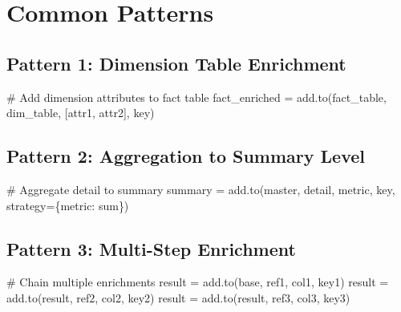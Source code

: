 \documentclass[
  letterpaper,
]{scrbook}
\newenvironment{Shaded}{\begin{snugshade}}{\end{snugshade}}
\newcommand{\CommentTok}[1]{\textcolor[rgb]{0.37,0.37,0.37}{#1}}
\newcommand{\NormalTok}[1]{\textcolor[rgb]{0.00,0.23,0.31}{#1}}
\newcommand{\OperatorTok}[1]{\textcolor[rgb]{0.37,0.37,0.37}{#1}}
\newcommand{\StringTok}[1]{\textcolor[rgb]{0.13,0.47,0.30}{#1}}
\begin{document}
\section{Common Patterns}\label{common-patterns}

\subsection{Pattern 1: Dimension Table
Enrichment}\label{pattern-1-dimension-table-enrichment}

\begin{Shaded}
\begin{Highlighting}[]
\CommentTok{\# Add dimension attributes to fact table}
\NormalTok{fact\_enriched }\OperatorTok{=}\NormalTok{ add.to(fact\_table, dim\_table, [}\StringTok{\textquotesingle{}attr1\textquotesingle{}}\NormalTok{, }\StringTok{\textquotesingle{}attr2\textquotesingle{}}\NormalTok{], }\StringTok{\textquotesingle{}key\textquotesingle{}}\NormalTok{)}
\end{Highlighting}
\end{Shaded}

\subsection{Pattern 2: Aggregation to Summary
Level}\label{pattern-2-aggregation-to-summary-level}

\begin{Shaded}
\begin{Highlighting}[]
\CommentTok{\# Aggregate detail to summary}
\NormalTok{summary }\OperatorTok{=}\NormalTok{ add.to(master, detail, }\StringTok{\textquotesingle{}metric\textquotesingle{}}\NormalTok{, }\StringTok{\textquotesingle{}key\textquotesingle{}}\NormalTok{, strategy}\OperatorTok{=}\NormalTok{\{}\StringTok{\textquotesingle{}metric\textquotesingle{}}\NormalTok{: }\StringTok{\textquotesingle{}sum\textquotesingle{}}\NormalTok{\})}
\end{Highlighting}
\end{Shaded}

\subsection{Pattern 3: Multi-Step
Enrichment}\label{pattern-3-multi-step-enrichment}

\begin{Shaded}
\begin{Highlighting}[]
\CommentTok{\# Chain multiple enrichments}
\NormalTok{result }\OperatorTok{=}\NormalTok{ add.to(base, ref1, }\StringTok{\textquotesingle{}col1\textquotesingle{}}\NormalTok{, }\StringTok{\textquotesingle{}key1\textquotesingle{}}\NormalTok{)}
\NormalTok{result }\OperatorTok{=}\NormalTok{ add.to(result, ref2, }\StringTok{\textquotesingle{}col2\textquotesingle{}}\NormalTok{, }\StringTok{\textquotesingle{}key2\textquotesingle{}}\NormalTok{)}
\NormalTok{result }\OperatorTok{=}\NormalTok{ add.to(result, ref3, }\StringTok{\textquotesingle{}col3\textquotesingle{}}\NormalTok{, }\StringTok{\textquotesingle{}key3\textquotesingle{}}\NormalTok{)}
\end{Highlighting}
\end{Shaded}
\end{document}

